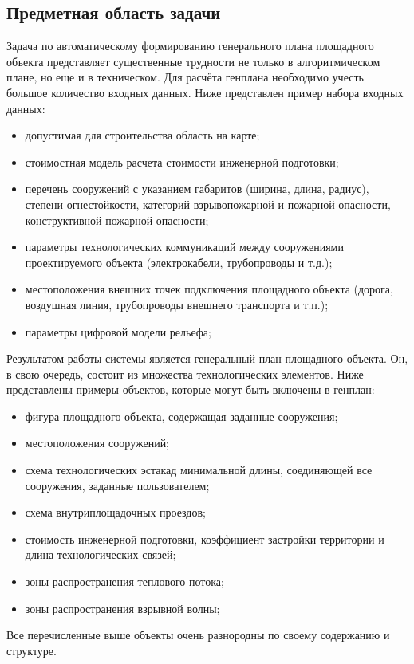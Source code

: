 \subsection{\Large{Предметная область задачи}}

Задача по автоматическому формированию генерального плана площадного объекта
представляет существенные трудности не только в алгоритмическом плане, но еще и в техническом.
Для расчёта генплана необходимо учесть большое количество входных данных.
Ниже представлен пример набора входных данных:
\begin{itemize}
    \item допустимая для строительства область на карте;
    \item стоимостная модель расчета стоимости инженерной подготовки;
    \item перечень сооружений с указанием габаритов (ширина, длина, радиус),
    степени огнестойкости, категорий взрывопожарной и пожарной опасности, конструктивной пожарной опасности;
    \item параметры технологических коммуникаций между сооружениями проектируемого объекта (электрокабели, трубопроводы и т.д.);
    \item местоположения внешних точек подключения площадного объекта
    (дорога, воздушная линия, трубопроводы внешнего транспорта и т.п.);
    \item параметры цифровой модели рельефа;
\end{itemize}

Результатом работы системы является генеральный план площадного объекта.
Он, в свою очередь, состоит из множества технологических элементов.
Ниже представлены примеры объектов, которые могут быть включены в генплан:
\begin{itemize}
    \item фигура площадного объекта, содержащая заданные сооружения;
    \item местоположения сооружений;
    \item схема технологических эстакад минимальной длины, соединяющей все сооружения, заданные пользователем;
    \item схема внутриплощадочных проездов;
    \item стоимость инженерной подготовки, коэффициент застройки территории и длина технологических связей;
    \item зоны распространения теплового потока;
    \item зоны распространения взрывной волны;
\end{itemize}

Все перечисленные выше объекты очень разнородны по своему содержанию и структуре.